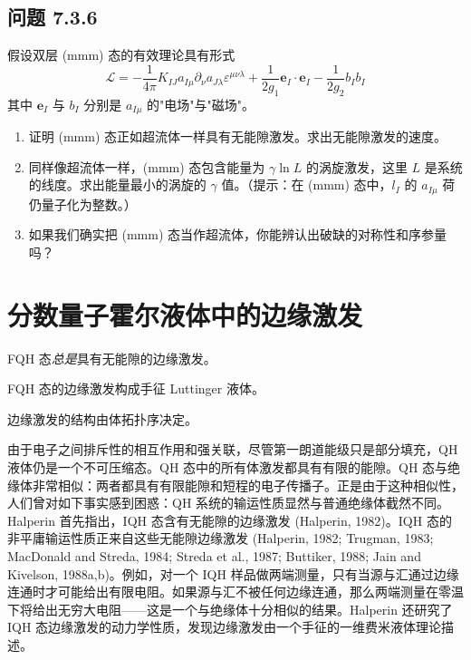 \subsection*{问题 7.3.6}
假设双层 (mmm) 态的有效理论具有形式
\begin{equation*}
\mathcal{L}=-\frac{1}{4\pi}K_{IJ}a_{I\mu}\partial_{\nu}a_{J\lambda}\varepsilon^{\mu\nu\lambda}
+\frac{1}{2g_{1}}\pmb{e}_{I}\cdot\pmb{e}_{I}-\frac{1}{2g_{2}}b_{I}b_{I}
\end{equation*}
其中 $\pmb{e}_{I}$ 与 $b_{I}$ 分别是 $a_{I\mu}$ 的"电场"与"磁场"。
\begin{enumerate}
\item 证明 (mmm) 态正如超流体一样具有无能隙激发。求出无能隙激发的速度。
\item 同样像超流体一样，(mmm) 态包含能量为 $\gamma\ln L$ 的涡旋激发，这里 $L$ 是系统的线度。求出能量最小的涡旋的 $\gamma$ 值。（提示：在 (mmm) 态中，$l_{I}$ 的 $a_{I\mu}$ 荷仍量子化为整数。）
\item 如果我们确实把 (mmm) 态当作超流体，你能辨认出破缺的对称性和序参量吗？
\end{enumerate}

\section{分数量子霍尔液体中的边缘激发}

\begin{keypoints}
\item FQH 态\emph{总是}具有无能隙的边缘激发。
\item FQH 态的边缘激发构成手征 Luttinger 液体。
\item 边缘激发的结构由体拓扑序决定。
\end{keypoints}

由于电子之间排斥性的相互作用和强关联，尽管第一朗道能级只是部分填充，QH 液体仍是一个不可压缩态。QH 态中的所有体激发都具有有限的能隙。QH 态与绝缘体非常相似：两者都具有有限能隙和短程的电子传播子。正是由于这种相似性，人们曾对如下事实感到困惑：QH 系统的输运性质显然与普通绝缘体截然不同。Halperin 首先指出，IQH 态含有无能隙的边缘激发 (Halperin, 1982)。IQH 态的非平庸输运性质正来自这些无能隙边缘激发 (Halperin, 1982; Trugman, 1983; MacDonald and Streda, 1984; Streda et al., 1987; Buttiker, 1988; Jain and Kivelson, 1988a,b)。例如，对一个 IQH 样品做两端测量，只有当源与汇通过边缘连通时才可能给出有限电阻。如果源与汇不被任何边缘连通，那么两端测量在零温下将给出无穷大电阻——这是一个与绝缘体十分相似的结果。Halperin 还研究了 IQH 态边缘激发的动力学性质，发现边缘激发由一个手征的一维费米液体理论描述。

